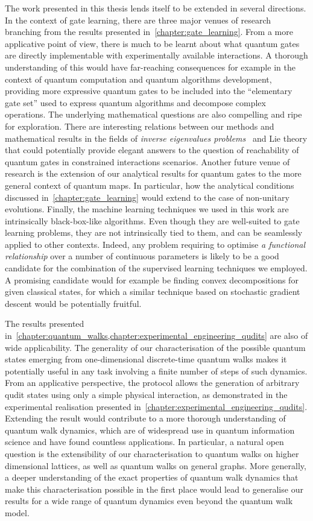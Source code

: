 \documentclass[12pt,twoside]{report}
\begin{document}
The work presented in this thesis lends itself to be extended in several directions.
In the context of gate learning, there are three major venues of research branching from the results presented in~\cref{chapter:gate_learning}.
From a more applicative point of view, there is much to be learnt about what quantum gates are directly implementable with experimentally available interactions.
A thorough understanding of this would have far-reaching consequences for example in the context of quantum computation and quantum algorithms development, providing more expressive quantum gates to be included into the ``elementary gate set'' used to express quantum algorithms and decompose complex operations.
The underlying mathematical questions are also compelling and ripe for exploration. There are interesting relations between our methods and mathematical results in the fields of \emph{inverse eigenvalues problems}~\cite{friedland1977inverse} and Lie theory that could potentially provide elegant answers to the question of reachability of quantum gates in constrained interactions scenarios.
Another future venue of research is the extension of our analytical results for quantum gates to the more general context of quantum maps.
In particular, how the analytical conditions discussed in~\cref{chapter:gate_learning} would extend to the case of non-unitary evolutions.
Finally, the machine learning techniques we used in this work are intrinsically black-box-like algorithms.
Even though they are well-suited to gate learning problems, they are not intrinsically tied to them, and can be seamlessly applied to other contexts.
Indeed, any problem requiring to optimise \emph{a functional relationship} over a number of continuous parameters is likely to be a good candidate for the combination of the supervised learning techniques we employed.
A promising candidate would for example be finding convex decompositions for given classical states, for which a similar technique based on stochastic gradient descent would be potentially fruitful.

The results presented in~\cref{chapter:quantum_walks,chapter:experimental_engineering_qudits} are also of wide applicability.
The generality of our characterisation of the possible quantum states emerging from one-dimensional discrete-time quantum walks makes it potentially useful in any task involving a finite number of steps of such dynamics.
From an applicative perspective, the protocol allows the generation of arbitrary qudit states using only a simple physical interaction, as demonstrated in the experimental realisation presented in~\cref{chapter:experimental_engineering_qudits}.
Extending the result would contribute to a more thorough understanding of quantum walk dynamics, which are of widespread use in quantum information science and have found countless applications.
In particular, a natural open question is the extensibility of our characterisation to quantum walks on higher dimensional lattices, as well as quantum walks on general graphs.
More generally, a deeper understanding of the exact properties of quantum walk dynamics that make this characterisation possible in the first place would lead to generalise our results for a wide range of quantum dynamics even beyond the quantum walk model.
\end{document}
